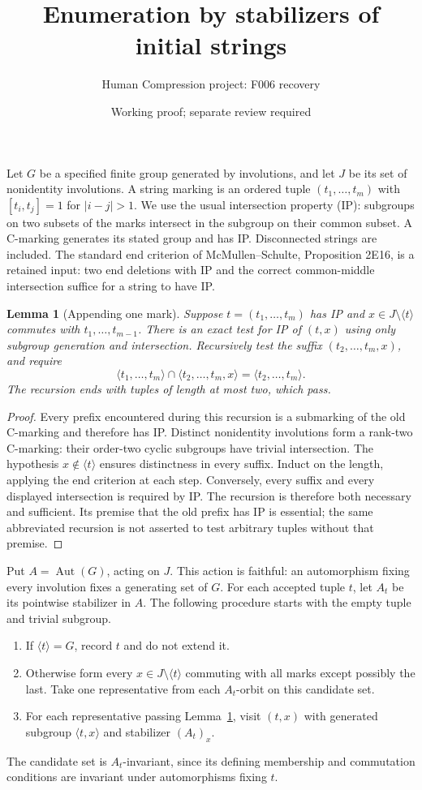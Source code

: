 \documentclass[11pt,a4paper]{article}
\title{Enumeration by stabilizers of initial strings}
\author{Human Compression project: F006 recovery}
\date{Working proof; separate review required}
\newtheorem{lemma}[theorem]{Lemma}
\newcommand{\gen}[1]{\langle#1\rangle}
\begin{document}
\maketitle
Let $G$ be a specified finite group generated by involutions, and let $J$
be its set of nonidentity involutions. A string marking is an ordered tuple
$(t_1,\ldots,t_m)$ with $[t_i,t_j]=1$ for $|i-j|>1$.
We use the usual intersection property (IP): subgroups on two subsets of
the marks intersect in the subgroup on their common subset. A C-marking
generates its stated group and has IP. Disconnected strings are included.
The standard end criterion of McMullen--Schulte, Proposition 2E16, is a
retained input: two end deletions with IP and the correct common-middle
intersection suffice for a string to have IP.

\begin{lemma}[Appending one mark]\label{append}
Suppose $t=(t_1,\ldots,t_m)$ has IP and $x\in J\setminus\gen t$
commutes with $t_1,\ldots,t_{m-1}$. There is an exact test for IP of
$(t,x)$ using only subgroup generation and intersection. Recursively test
the suffix $(t_2,\ldots,t_m,x)$, and require
\[
 \gen{t_1,\ldots,t_m}\cap\gen{t_2,\ldots,t_m,x}
       =\gen{t_2,\ldots,t_m}.
\]
The recursion ends with tuples of length at most two, which pass.
\end{lemma}
\begin{proof}
Every prefix encountered during this recursion is a submarking of the old
C-marking and therefore has IP. Distinct nonidentity involutions form a
rank-two C-marking: their order-two cyclic subgroups have trivial
intersection. The hypothesis $x\notin\gen t$ ensures distinctness in every
suffix. Induct on the length, applying the end criterion at each step.
Conversely, every suffix and every displayed intersection is required by
IP. The recursion is therefore both necessary and sufficient. Its premise
that the old prefix has IP is essential; the same abbreviated recursion is
not asserted to test arbitrary tuples without that premise.
\end{proof}

Put $A=\operatorname{Aut}(G)$, acting on $J$. This action is faithful:
an automorphism fixing every involution fixes a generating set of $G$.
For each accepted tuple $t$, let $A_t$ be its pointwise stabilizer in $A$.
The following procedure starts with the empty tuple and trivial subgroup.
\begin{enumerate}
\item If $\gen t=G$, record $t$ and do not extend it.
\item Otherwise form every $x\in J\setminus\gen t$ commuting with
all marks except possibly the last. Take one representative from each
$A_t$-orbit on this candidate set.
\item For each representative passing Lemma~\ref{append}, visit $(t,x)$
with generated subgroup $\gen{t,x}$ and stabilizer $(A_t)_x$.
\end{enumerate}
The candidate set is $A_t$-invariant, since its defining membership and
commutation conditions are invariant under automorphisms fixing $t$.
\end{document}
